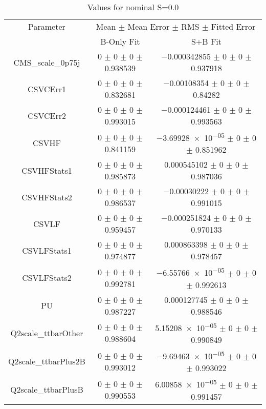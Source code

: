 \begin{table}
\centering
\caption{Values for nominal S=0.0}
\begin{tabular}{ccc}
\toprule
Parameter & \multicolumn{2}{c}{Mean $\pm$ Mean Error $\pm$ RMS $\pm$ Fitted Error}\\
 & B-Only Fit & S+B Fit\\
\midrule
CMS\_scale\_0p75j & \num{0} $\pm$ \num{0} $\pm$ \num{0} $\pm$ \num{0.938539} & \num{-0.000342855} $\pm$ \num{0} $\pm$ \num{0} $\pm$ \num{0.937918}\\
CSVCErr1 & \num{0} $\pm$ \num{0} $\pm$ \num{0} $\pm$ \num{0.832681} & \num{-0.00108354} $\pm$ \num{0} $\pm$ \num{0} $\pm$ \num{0.84282}\\
CSVCErr2 & \num{0} $\pm$ \num{0} $\pm$ \num{0} $\pm$ \num{0.993015} & \num{-0.000124461} $\pm$ \num{0} $\pm$ \num{0} $\pm$ \num{0.993563}\\
CSVHF & \num{0} $\pm$ \num{0} $\pm$ \num{0} $\pm$ \num{0.841159} & \num{-3.69928e-05} $\pm$ \num{0} $\pm$ \num{0} $\pm$ \num{0.851962}\\
CSVHFStats1 & \num{0} $\pm$ \num{0} $\pm$ \num{0} $\pm$ \num{0.985873} & \num{0.000545102} $\pm$ \num{0} $\pm$ \num{0} $\pm$ \num{0.987036}\\
CSVHFStats2 & \num{0} $\pm$ \num{0} $\pm$ \num{0} $\pm$ \num{0.986537} & \num{-0.00030222} $\pm$ \num{0} $\pm$ \num{0} $\pm$ \num{0.991015}\\
CSVLF & \num{0} $\pm$ \num{0} $\pm$ \num{0} $\pm$ \num{0.959457} & \num{-0.000251824} $\pm$ \num{0} $\pm$ \num{0} $\pm$ \num{0.970133}\\
CSVLFStats1 & \num{0} $\pm$ \num{0} $\pm$ \num{0} $\pm$ \num{0.974877} & \num{0.000863398} $\pm$ \num{0} $\pm$ \num{0} $\pm$ \num{0.978457}\\
CSVLFStats2 & \num{0} $\pm$ \num{0} $\pm$ \num{0} $\pm$ \num{0.992781} & \num{-6.55766e-05} $\pm$ \num{0} $\pm$ \num{0} $\pm$ \num{0.992613}\\
PU & \num{0} $\pm$ \num{0} $\pm$ \num{0} $\pm$ \num{0.987227} & \num{0.000127745} $\pm$ \num{0} $\pm$ \num{0} $\pm$ \num{0.988546}\\
Q2scale\_ttbarOther & \num{0} $\pm$ \num{0} $\pm$ \num{0} $\pm$ \num{0.988604} & \num{5.15208e-05} $\pm$ \num{0} $\pm$ \num{0} $\pm$ \num{0.990849}\\
Q2scale\_ttbarPlus2B & \num{0} $\pm$ \num{0} $\pm$ \num{0} $\pm$ \num{0.993012} & \num{-9.69463e-05} $\pm$ \num{0} $\pm$ \num{0} $\pm$ \num{0.993022}\\
Q2scale\_ttbarPlusB & \num{0} $\pm$ \num{0} $\pm$ \num{0} $\pm$ \num{0.990553} & \num{6.00858e-05} $\pm$ \num{0} $\pm$ \num{0} $\pm$ \num{0.991457}\\

\end{tabular}
\end{table}
